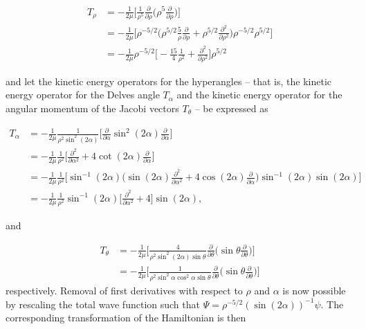 \begin{equation}\label{eq:kinetic_rho}
\begin{aligned}
T_{\rho} &= -\frac{1}{2\mu} \Big[ \frac{1}{\rho^5}\frac{\partial}{\partial\rho} \Big( \rho^5 \frac{\partial}{\partial\rho} \Big)  \Big] \\ 
&= -\frac{1}{2\mu} \Big[ \rho^{-5/2} \Big( \rho^{5/2} \frac{5}{\rho} \frac{\partial}{\partial\rho} + \rho^{5/2} \frac{\partial^2}{\partial\rho^2} \Big) \rho^{-5/2} \rho^{5/2} \Big]\\
&= -\frac{1}{2\mu} \rho^{-5/2} \Big[  -\frac{15}{4} \frac{1}{\rho^2} + \frac{\partial^2}{\partial\rho^2} \Big] \rho^{5/2}
\end{aligned}
\end{equation}

and let the kinetic energy operators for the hyperangles -- that is, the kinetic energy operator for the Delves angle $T_{\alpha}$ and the kinetic energy operator for the angular momentum of the Jacobi vectors $T_{\theta}$ -- be expressed as 

\begin{equation}\label{eq:kinetic_alpha}
\begin{aligned}
T_{\alpha} &= -\frac{1}{2\mu}  \frac{1}{\rho^2 \sin^2(2\alpha)}  \bigg[ \frac{\partial}{\partial\alpha} \sin^2(2\alpha) \frac{\partial}{\partial\alpha} \bigg]\\ 
&= -\frac{1}{2\mu} \frac{1}{\rho^2} \bigg[ \frac{\partial^2}{\partial\alpha^2} + 4\cot(2\alpha) \frac{\partial}{\partial\alpha} \bigg]\\
&= -\frac{1}{2\mu} \frac{1}{\rho^2} \bigg[ \sin^{-1}(2\alpha) \bigg(\sin(2\alpha)\frac{\partial^2}{\partial\alpha^2} + 4\cos(2\alpha) \frac{\partial}{\partial\alpha} \bigg) \sin^{-1}(2\alpha) \sin(2\alpha) \bigg]\\
&= -\frac{1}{2\mu} \frac{1}{\rho^2}\sin^{-1}(2\alpha) \bigg[ \frac{\partial^2}{\partial\alpha^2} + 4 \bigg] \sin(2\alpha),
\end{aligned} 
\end{equation}

and

\begin{align}                  
T_{\theta} &= -\frac{1}{2\mu} \bigg[ \frac{4}{\rho^2 \sin^2(2\alpha)\sin\theta} \frac{\partial}{\partial\theta} \bigg( \sin\theta \frac{\partial}{\partial\theta} \bigg) \bigg]\nonumber\\ 
&= -\frac{1}{2\mu} \bigg[ \frac{1}{\rho^2 \sin^2\alpha\cos^2\alpha\sin\theta} \frac{\partial}{\partial\theta} \bigg( \sin\theta \frac{\partial}{\partial\theta} \bigg) \bigg]
\end{align}
respectively. Removal of first derivatives with respect to $\rho$ and $\alpha$ is now possible by rescaling the total wave function such that $\Psi = \rho^{-5/2}(\sin(2\alpha))^{-1}\psi$. The corresponding transformation of the Hamiltonian is then

